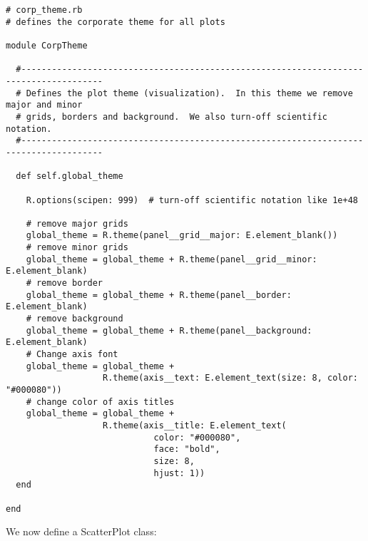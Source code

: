 \documentclass[]{article}
\begin{document}
\begin{verbatim}
# corp_theme.rb
# defines the corporate theme for all plots
    
module CorpTheme

  #--------------------------------------------------------------------------------------
  # Defines the plot theme (visualization).  In this theme we remove major and minor
  # grids, borders and background.  We also turn-off scientific notation.
  #--------------------------------------------------------------------------------------
  
  def self.global_theme
    
    R.options(scipen: 999)  # turn-off scientific notation like 1e+48
    
    # remove major grids
    global_theme = R.theme(panel__grid__major: E.element_blank())
    # remove minor grids
    global_theme = global_theme + R.theme(panel__grid__minor: E.element_blank)
    # remove border
    global_theme = global_theme + R.theme(panel__border: E.element_blank)
    # remove background
    global_theme = global_theme + R.theme(panel__background: E.element_blank)
    # Change axis font
    global_theme = global_theme +
                   R.theme(axis__text: E.element_text(size: 8, color: "#000080"))
    # change color of axis titles
    global_theme = global_theme +
                   R.theme(axis__title: E.element_text(
                             color: "#000080", 
                             face: "bold",
                             size: 8,
                             hjust: 1))
  end
   
end
\end{verbatim}

We now define a ScatterPlot class:
\end{document}

